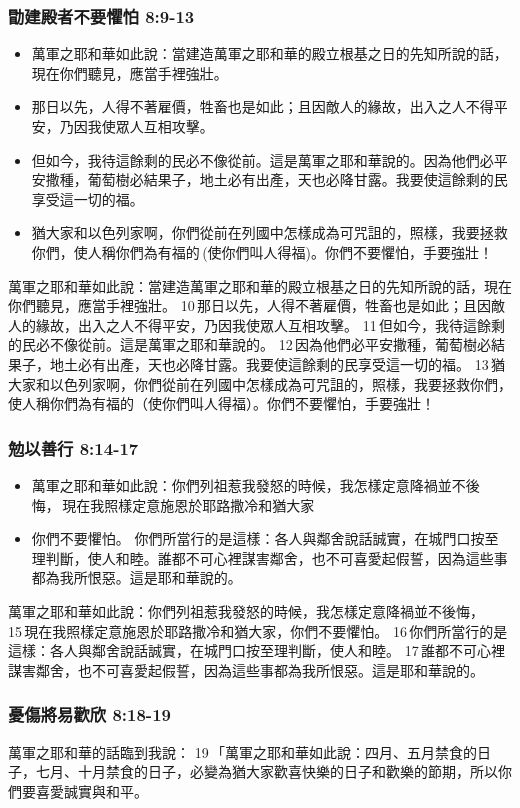 \subsubsection{勖建殿者不要懼怕 8:9-13} 
\begin{itemize} 
\itemsep-.5em 
\item 萬軍之耶和華如此說：當建造萬軍之耶和華的殿立根基之日的先知所說的話，現在你們聽見，應當手裡強壯。 
\item 那日以先，人得不著雇價，牲畜也是如此；且因敵人的緣故，出入之人不得平安，乃因我使眾人互相攻擊。 
\item 但如今，我待這餘剩的民必不像從前。這是萬軍之耶和華說的。因為他們必平安撒種，葡萄樹必結果子，地土必有出產，天也必降甘露。我要使這餘剩的民享受這一切的福。
\item 猶大家和以色列家啊，你們從前在列國中怎樣成為可咒詛的，照樣，我要拯救你們，使人稱你們為有福的 (使你們叫人得福)。你們不要懼怕，手要強壯！
\end{itemize}
萬軍之耶和華如此說：當建造萬軍之耶和華的殿立根基之日的先知所說的話，現在你們聽見，應當手裡強壯。 10 那日以先，人得不著雇價，牲畜也是如此；且因敵人的緣故，出入之人不得平安，乃因我使眾人互相攻擊。 11 但如今，我待這餘剩的民必不像從前。這是萬軍之耶和華說的。 12 因為他們必平安撒種，葡萄樹必結果子，地土必有出產，天也必降甘露。我要使這餘剩的民享受這一切的福。 13 猶大家和以色列家啊，你們從前在列國中怎樣成為可咒詛的，照樣，我要拯救你們，使人稱你們為有福的（使你們叫人得福）。你們不要懼怕，手要強壯！

\subsubsection{勉以善行 8:14-17} 
\begin{itemize} 
\itemsep-.5em 
\item 萬軍之耶和華如此說：你們列祖惹我發怒的時候，我怎樣定意降禍並不後悔， 現在我照樣定意施恩於耶路撒冷和猶大家
\item 你們不要懼怕。 你們所當行的是這樣：各人與鄰舍說話誠實，在城門口按至理判斷，使人和睦。誰都不可心裡謀害鄰舍，也不可喜愛起假誓，因為這些事都為我所恨惡。這是耶和華說的。
\end{itemize}
萬軍之耶和華如此說：你們列祖惹我發怒的時候，我怎樣定意降禍並不後悔， 15 現在我照樣定意施恩於耶路撒冷和猶大家，你們不要懼怕。 16 你們所當行的是這樣：各人與鄰舍說話誠實，在城門口按至理判斷，使人和睦。 17 誰都不可心裡謀害鄰舍，也不可喜愛起假誓，因為這些事都為我所恨惡。這是耶和華說的。

\subsubsection{憂傷將易歡欣 8:18-19}
萬軍之耶和華的話臨到我說： 19 「萬軍之耶和華如此說：四月、五月禁食的日子，七月、十月禁食的日子，必變為猶大家歡喜快樂的日子和歡樂的節期，所以你們要喜愛誠實與和平。

